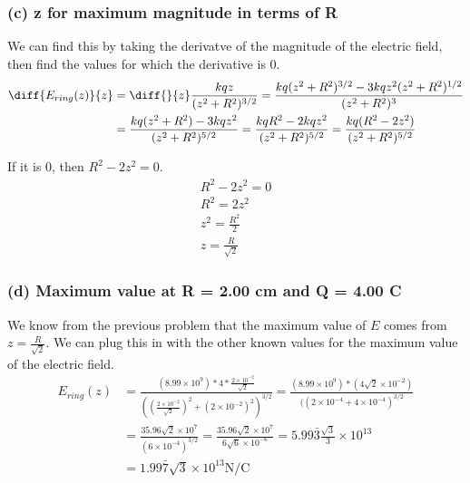 \documentclass[12pt]{article}
\begin{document}
\pagebreak
\subsubsection*{(c) z for maximum magnitude in terms of R}
We can find this by taking the derivatve of the magnitude of the electric field, then find the values for which the derivative is 0.
\begin{align*}
    \diff{E_{ring}(z)}{z}   &=  \diff{}{z}\frac{kqz}{(z^2 + R^2)^{3/2}}
        =   \frac{kq(z^2 + R^2)^{3/2} - 3kqz^2 (z^2 + R^2)^{1/2}}{(z^2 + R^2)^{3}}\\
        &=  \frac{kq(z^2 + R^2) - 3kqz^2}{(z^2 + R^2)^{5/2}}
        =   \frac{kqR^2 - 2kqz^2}{(z^2 + R^2)^{5/2}}
        =   \frac{kq(R^2 - 2z^2)}{(z^2 + R^2)^{5/2}}
\end{align*}

If it is 0, then \(R^2 - 2z^2 = 0\).
\begin{gather*}
    R^2 - 2z^2 = 0\\
    R^2 =   2z^2\\
    z^2 =   \frac{R^2}{2}\\
    \boxed{z   =   \frac{R}{\sqrt{2}}}
\end{gather*}

\subsubsection*{(d) Maximum value at R = 2.00 cm and Q = 4.00 C}
We know from the previous problem that the maximum value of $E$ comes from $z = \frac{R}{\sqrt{2}}$. We can plug this in with the other known values for the maximum value of the electric field.
\begin{align*}
    E_{ring}(z) &=  \frac{(8.99 \times 10^9)*4*\frac{2 \times 10^{-2}}{\sqrt{2}}}{((\frac{2 \times 10^{-2}}{\sqrt{2}})^2 + (2 \times 10^{-2})^2)^{3/2}}
        =   \frac{(8.99 \times 10^9)*(4\sqrt{2} \times 10^{-2})}{((2 \times 10^{-4} + 4 \times 10^{-4})^{3/2}}\\
        &=  \frac{35.96\sqrt{2} \times 10^{7}}{(6 \times 10^{-4})^{3/2}}
        =   \frac{35.96\sqrt{2} \times 10^7}{6\sqrt{6} \times 10^{-6}}
        =   5.99\bar{3}\frac{\sqrt{3}}{3} \times 10^{13}\\
        &=  \boxed{1.99\bar{7} \sqrt{3} \times 10^{13} \unit{\newton/\coulomb}}
\end{align*}

\pagebreak
\end{document}
